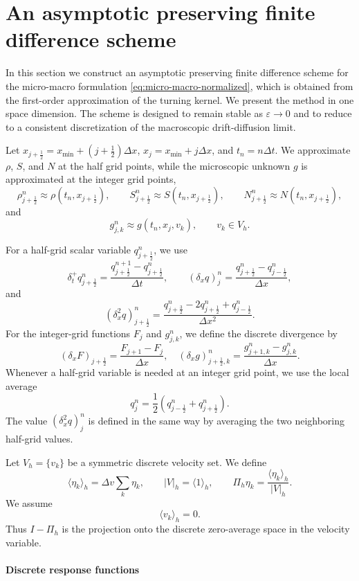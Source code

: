 \documentclass[11pt,twoside]{article}
\numberwithin{equation}{section}
\theoremstyle{plain}
\theoremstyle{nonumberplain}
\begin{document}
{\color{red}
\section{An asymptotic preserving finite difference scheme}
\label{sec:scheme}

In this section we construct an asymptotic preserving finite difference
scheme for the micro-macro formulation \eqref{eq:micro-macro-normalized},
which is obtained from the first-order approximation of the turning
kernel. We present the method in one space dimension. The scheme is
designed to remain stable as \(\varepsilon\to0\) and to reduce to a
consistent discretization of the macroscopic drift-diffusion limit.

Let \(x_{j+\frac12}=x_{\min}+(j+\frac12)\Delta x\),
\(x_j=x_{\min}+j\Delta x\), and \(t_n=n\Delta t\). We approximate
\(\rho\), \(S\), and \(N\) at the half grid points, while the microscopic
unknown \(g\) is approximated at the integer grid points,
\[
\rho_{j+\frac12}^n\approx \rho(t_n,x_{j+\frac12}),\qquad
S_{j+\frac12}^n\approx S(t_n,x_{j+\frac12}),\qquad
N_{j+\frac12}^n\approx N(t_n,x_{j+\frac12}),
\]
and
\[
g_{j,k}^n\approx g(t_n,x_j,v_k),\qquad v_k\in V_h .
\]

For a half-grid scalar variable \(q_{j+\frac12}^n\), we use
\[
\delta_t^+ q_{j+\frac12}^n
=
\frac{q_{j+\frac12}^{n+1}-q_{j+\frac12}^n}{\Delta t},
\qquad
(\delta_x q)_j^n
=
\frac{q_{j+\frac12}^n-q_{j-\frac12}^n}{\Delta x},
\]
and
\[
(\delta_x^2 q)_{j+\frac12}^n
=
\frac{
q_{j+\frac32}^n
-2q_{j+\frac12}^n
+q_{j-\frac12}^n
}{\Delta x^2}.
\]
For the integer-grid functions \(F_j\) and \(g_{j,k}^n\), we define the discrete divergence by
\[
(\delta_x F)_{j+\frac12}
=
\frac{F_{j+1}-F_j}{\Delta x},
\quad 
(\delta_x g)_{j+\frac12,k}^n
=
\frac{g_{j+1,k}^n-g_{j,k}^n}{\Delta x}.
\]
Whenever a half-grid variable is needed at an integer grid point, we use
the local average
\[
q_j^n=\frac12\left(q_{j-\frac12}^n+q_{j+\frac12}^n\right).
\]
The value \((\delta_x^2 q)_j^n\) is defined in the same way by averaging
the two neighboring half-grid values.

Let \(V_h=\{v_k\}\) be a symmetric discrete velocity set. We define
\[
\langle \eta_k\rangle_h=\Delta v\sum_k \eta_k,
\qquad
|V|_h=\langle 1\rangle_h,
\qquad
\Pi_h\eta_k=\frac{\langle \eta_k\rangle_h}{|V|_h}.
\]
We assume
\[
\langle v_k\rangle_h=0.
\]
Thus \(I-\Pi_h\) is the projection onto the discrete zero-average space in
the velocity variable.

\paragraph{Discrete response functions}

}
\end{document}
